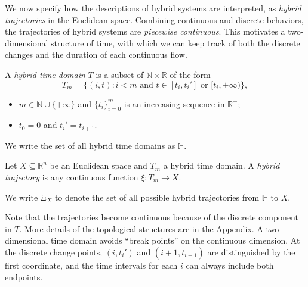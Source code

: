 \documentclass[envcountsect]{llncs}
\begin{document}
We now specify how the descriptions of hybrid systems are interpreted, as {\em
hybrid trajectories} in the Euclidean space. Combining continuous and discrete
behaviors, the trajectories of hybrid systems are {\em piecewise continuous}.
This motivates a two-dimensional structure of time, with which we can
keep track of both the discrete changes and the duration of each continuous
flow.
\begin{definition}
A {\em hybrid time domain} $T$ is a subset of
 $\mathbb{N}\times \mathbb{R}$ of the form
$$T_m=\{(i, t): i<m \mbox{ and } t\in [t_i, t_i']\mbox{ or }[t_i, +\infty)\},$$
\begin{itemize}
 \item $m\in \mathbb{N}\cup\{+\infty\}$ and $\{t_i\}_{i=0}^m$ is an
increasing sequence in $\mathbb{R}^+$;
 \item $t_0= 0$ and $t_i'=t_{i+1}$.
 \end{itemize}
We write the set of all hybrid time domains as $\mathbb{H}$.
\end{definition}
\begin{definition}
Let $X\subseteq\mathbb{R}^n$ be an Euclidean space and $T_m$ a hybrid
time domain. A {\em hybrid trajectory} is any continuous function $\xi: T_m
\rightarrow X.$
 \end{definition}
We write $\Xi_X$ to denote the set of all possible hybrid trajectories from
$\mathbb{H}$ to $X$.
 \begin{remark}
Note that the trajectories become continuous because of the discrete component
in $T$. More details of the topological structures are in the
Appendix. A two-dimensional time domain avoids ``break points'' on the
continuous dimension. At the discrete change points, $(i,t_i')$ and $(i+1,
t_{i+1})$ are distinguished by the first coordinate, and the time intervals for
each $i$ can
always include both endpoints.
\end{remark}
\end{document}
